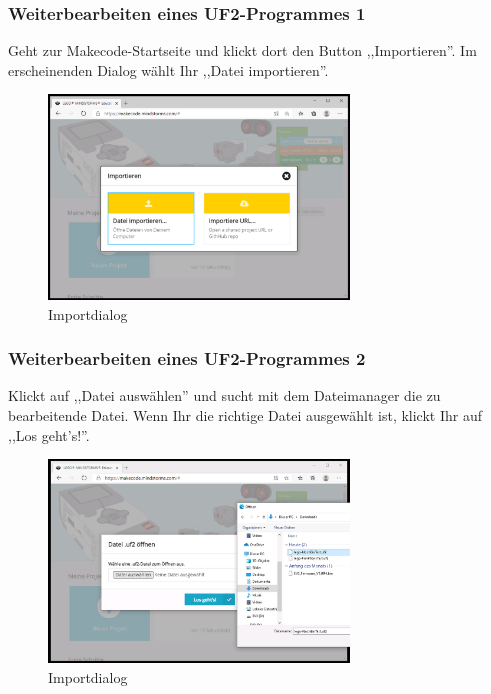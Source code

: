 \documentclass{beamer}
\begin{document}
\begin{frame}
\frametitle{Weiterbearbeiten eines UF2-Programmes 1}

Geht zur Makecode-Startseite und klickt dort den Button ,,Importieren''. Im erscheinenden Dialog wählt Ihr ,,Datei importieren''.

\begin{figure}
  \includegraphics[width=8cm]{mkcd03.png}
  \caption{Importdialog}
  \label{fig:mkcd3}
\end{figure}
\end{frame}

\begin{frame}
\frametitle{Weiterbearbeiten eines UF2-Programmes 2}
Klickt auf ,,Datei auswählen'' und sucht mit dem Dateimanager die zu bearbeitende Datei. Wenn Ihr die richtige Datei ausgewählt ist, klickt Ihr auf ,,Los geht's!''.

\begin{figure}
  \includegraphics[width=8cm]{mkcd04.png}
  \caption{Importdialog}
  \label{fig:mkcd4}
\end{figure}
\end{frame}
\end{document}
